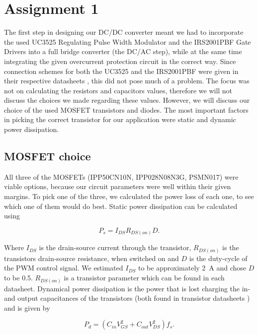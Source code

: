 \documentclass[11pt,titlepage]{report}
\begin{document}
\chapter*{Assignment 1}
The first step in designing our DC/DC converter meant we had to incorporate the used UC3525 Regulating Pulse Width Modulator and the IRS2001PBF Gate Drivers into a full bridge converter (the DC/AC step), while at the same time integrating the given overcurrent protection circuit in the correct way. Since connection schemes for both the UC3525 and the IRS2001PBF were given in their respective datasheets \cite{uc3525a-datasheet,irs2001pbf-datasheet}, this did not pose much of a problem. The focus was not on calculating the resistors and capacitors values, therefore we will not discuss the choices we made regarding these values.
However, we will discuss our choice of the used MOSFET transistors and diodes. The most important factors in picking the correct transistor for our application were static and dynamic power dissipation.

\section*{MOSFET choice}
All three of the MOSFETs (IPP50CN10N, IPP028N08N3G, PSMN017) were viable options, because our circuit parameters were well within their given margins. To pick one of the three, we calculated the power loss of each one, to see which one of them would do best.
Static power dissipation can be calculated using

\begin{equation}
P_{s} = I_{DS}R_{DS(on)}D .
\end{equation}

Where $I_{DS}$ is the drain-source current through the transistor, $R_{DS(on)}$ is the transistors drain-source resistance, when switched on and $D$ is the duty-cycle of the PWM control signal. We estimated $I_{DS}$ to be approximately \SI{2}{A} and chose $D$ to be \num{0.5}. $R_{DS(on)}$ is a transistor parameter which can be found in each datasheet.
Dynamical power dissipation is the power that is lost charging the in- and output capacitances of the transistors (both found in transistor datasheets \cite{IPP50CN10N-datasheet,IPP028N08N3G-datasheet,PSMN017-datasheet}) and is given by

\begin{equation}
P_{d} = (C_{in}V_{GS}^2 + C_{out}V_{DS}^2)f_{s} .
\end{equation}
\end{document}
